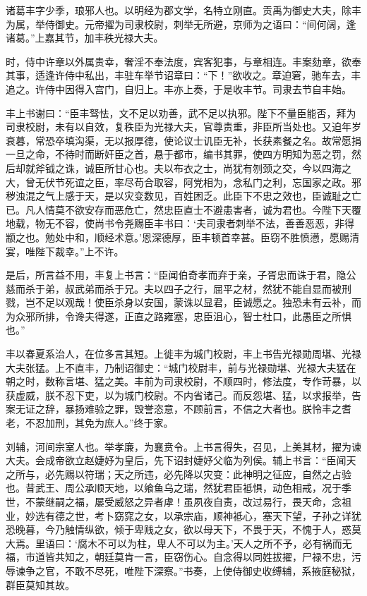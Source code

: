 \documentclass[12pt,UTF8]{ctexbook}
\begin{document}
诸葛丰字少季，琅邪人也。以明经为郡文学，名特立刚直。贡禹为御史大夫，除丰为属，举侍御史。元帝擢为司隶校尉，刺举无所避，京师为之语曰：“间何阔，逢诸葛。”上嘉其节，加丰秩光禄大夫。



时，侍中许章以外属贵幸，奢淫不奉法度，宾客犯事，与章相连。丰案劾章，欲奉其事，适逢许侍中私出，丰驻车举节诏章曰：“下！”欲收之。章迫窘，驰车去，丰追之。许侍中因得入宫门，自归上。丰亦上奏，于是收丰节。司隶去节自丰始。



丰上书谢曰：“臣丰驽怯，文不足以劝善，武不足以执邪。陛下不量臣能否，拜为司隶校尉，未有以自效，复秩臣为光禄大夫，官尊责重，非臣所当处也。又迫年岁衰暮，常恐卒填沟渠，无以报厚德，使论议士讥臣无补，长获素餐之名。故常愿捐一旦之命，不待时而断奸臣之首，悬于都市，编书其罪，使四方明知为恶之罚，然后却就斧钺之诛，诚臣所甘心也。夫以布衣之士，尚犹有刎颈之交，今以四海之大，曾无伏节死谊之臣，率尽苟合取容，阿党相为，念私门之利，忘国家之政。邪秽浊混之气上感于天，是以灾变数见，百姓困乏。此臣下不忠之效也，臣诚耻之亡已。凡人情莫不欲安存而恶危亡，然忠臣直士不避患害者，诚为君也。今陛下天覆地载，物无不容，使尚书令尧赐臣丰书曰：‘夫司隶者刺举不法，善善恶恶，非得颛之也。勉处中和，顺经术意。’恩深德厚，臣丰顿首幸甚。臣窃不胜愤懑，愿赐清宴，唯陛下裁幸。”上不许。



是后，所言益不用，丰复上书言：“臣闻伯奇孝而弃于亲，子胥忠而诛于君，隐公慈而杀于弟，叔武弟而杀于兄。夫以四子之行，屈平之材，然犹不能自显而被刑戮，岂不足以观哉！使臣杀身以安国，蒙诛以显君，臣诚愿之。独恐未有云补，而为众邪所排，令谗夫得遂，正直之路雍塞，忠臣沮心，智士杜口，此愚臣之所惧也。”



丰以春夏系治人，在位多言其短。上徙丰为城门校尉，丰上书告光禄勋周堪、光禄大夫张猛。上不直丰，乃制诏御史：“城门校尉丰，前与光禄勋堪、光禄大夫猛在朝之时，数称言堪、猛之美。丰前为司隶校尉，不顺四时，修法度，专作苛暴，以获虚威，朕不忍下吏，以为城门校尉。不内省诸己。而反怨堪、猛，以求报举，告案无证之辞，暴扬难验之罪，毁誉恣意，不顾前言，不信之大者也。朕怜丰之耆老，不忍加刑，其免为庶人。”终于家。



刘辅，河间宗室人也。举孝廉，为襄贲令。上书言得失，召见，上美其材，擢为谏大夫。会成帝欲立赵婕妤为皇后，先下诏封婕妤父临为列侯。辅上书言：“臣闻天之所与，必先赐以符瑞；天之所违，必先降以灾变：此神明之征应，自然之占验也。昔武王、周公承顺天地，以飨鱼乌之瑞，然犹君臣袛惧，动色相戒，况于季世，不蒙继嗣之福，屡受威怒之异者虖！虽夙夜自责，改过易行，畏天命，念祖业，妙选有德之世，考卜窈窕之女，以承宗庙，顺神袛心，塞天下望，子孙之详犹恐晚暮，今乃触情纵欲，倾于卑贱之女，欲以母天下，不畏于天，不愧于人，惑莫大焉。里语曰：‘腐木不可以为柱，卑人不可以为主。’天人之所不予，必有祸而无福，市道皆共知之，朝廷莫肯一言，臣窃伤心。自念得以同姓拔擢，尸禄不忠，污辱谏争之官，不敢不尽死，唯陛下深察。”书奏，上使侍御史收缚辅，系掖庭秘狱，群臣莫知其故。
\end{document}
